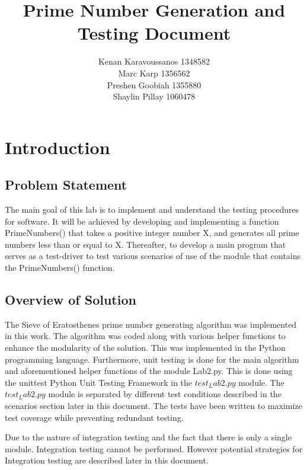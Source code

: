 \documentclass[]{article}
\title{Prime Number Generation and Testing Document}
\begin{document}
\author{
Kenan Karavoussanos 1348582 \\Marc Karp 1356562 \\Preshen Goobiah 1355880\\Shaylin Pillay 1060478}
    {}
\maketitle
\hfil \newpage
\tableofcontents
\hfil \newpage

\section{Introduction}


\subsection{Problem Statement}
The main goal of this lab is to implement and understand the testing procedures for software. It will be achieved by developing and implementing a function PrimeNumbers() that takes a positive integer number X, and generates all prime numbers less than or equal to X. Thereafter,  to develop a main program that serves as a test-driver to test various scenarios of use of the module that contains the PrimeNumbers() function.

\subsection{Overview of Solution}

The Sieve of Eratosthenes prime number generating algorithm was implemented in this work. The algorithm was coded along with various helper functions to enhance the modularity of the solution.
This was implemented in the Python programming language. Furthermore, unit testing is done for the main algorithm and aforementioned helper functions of the module Lab2.py. This is done using the unittest Python Unit Testing Framework in the $test_Lab2.py$ module.
The  $test_Lab2.py$ module is separated by different test conditions described in the scenarios section later in this document. The tests have been written to maximize test coverage while preventing redundant testing. 

Due to the nature of integration testing and the fact that there is only a single module. Integration testing cannot be performed. However potential strategies for Integration testing are described later in this document.
\end{document}
